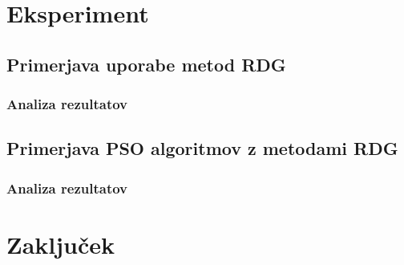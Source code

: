 \chapter{Eksperiment}\label{chap:exp}


\section{Primerjava uporabe metod RDG}


\subsection{Analiza rezultatov}


\section{Primerjava PSO algoritmov z metodami RDG}


\subsection{Analiza rezultatov}


\chapter{Zaključek}\label{chap:end}

